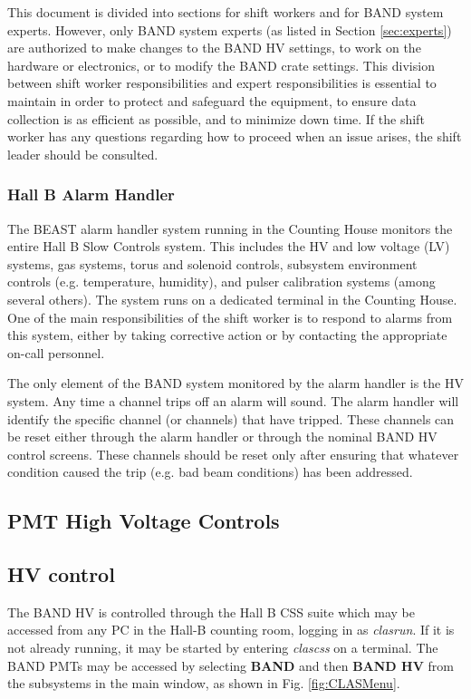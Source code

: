 \documentclass[12pt,letterpaper]{article}
\begin{document}
This document is divided into sections for shift workers and for BAND system experts. However, only BAND system experts (as listed in Section \ref{sec:experts}) are authorized to make changes to the BAND HV settings, to work on the hardware or electronics, or to modify the BAND crate settings. This division between shift worker responsibilities and expert responsibilities is essential to maintain in order to protect and safeguard the equipment, to ensure data collection is as efficient as possible, and to minimize down time. If the shift worker has any questions regarding how to proceed when an issue arises, the shift leader should be consulted.
\subsubsection{Hall B Alarm Handler}
\label{sssec:alarms}
The BEAST alarm handler system running in the Counting House monitors the entire Hall B Slow Controls system. This includes the HV and low voltage (LV) systems, gas systems, torus and solenoid controls, subsystem environment controls (e.g. temperature, humidity), and pulser calibration systems (among several others). The system runs on a dedicated terminal in the Counting House. One of the main responsibilities of the shift worker is to respond to alarms from this system, either by taking corrective action or by contacting the appropriate on-call personnel. %

The only element of the BAND system monitored by the alarm handler is the HV system. Any time a channel trips off an alarm will sound. The alarm handler will identify the specific channel (or channels) that have tripped. These channels can be reset either through the alarm handler or through the nominal BAND HV control screens. These channels should be reset only after ensuring that whatever condition caused the trip (e.g. bad beam conditions) has been addressed.



\subsection{PMT High Voltage Controls}
\label{ssec:hv}
\subsection{HV control}
The BAND HV is controlled through the Hall B CSS suite which may be accessed from any PC in the Hall-B counting room, logging in as \textit{clasrun}. If it is not already running, it may be started by entering \textit{clascss} on a terminal. The BAND PMTs may be accessed by selecting \textbf{BAND} and then \textbf{BAND HV} from the subsystems in the main window, as shown in Fig. \ref{fig:CLASMenu}.
\end{document}
